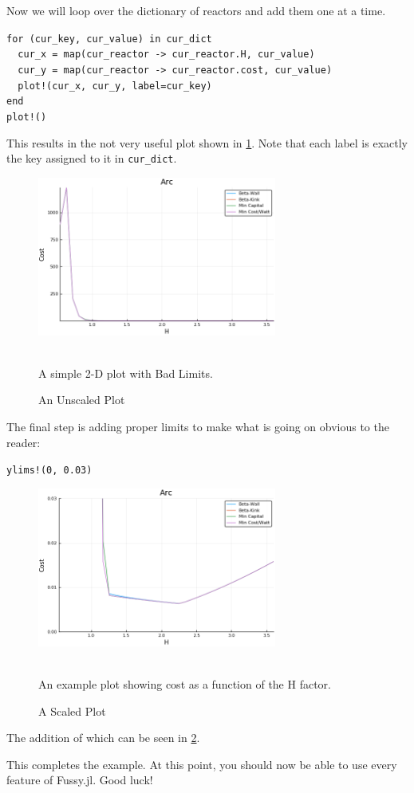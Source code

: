 Now we will loop over the dictionary of reactors and add them one at a time.

\begin{addmargin}[1.5em]{1.5em}
\texttt{for (cur\_key, cur\_value) in cur\_dict \\
\-\ \-\ cur\_x = map(cur\_reactor -> cur\_reactor.H, cur\_value) \\
\-\ \-\ cur\_y = map(cur\_reactor -> cur\_reactor.cost, cur\_value) \\
\-\ \-\ plot!(cur\_x, cur\_y, label=cur\_key) \\
end \\
plot!()
}
\end{addmargin}

This results in the not very useful plot shown in \cref{fig:example_3}. Note that each label is exactly the key assigned to it in \texttt{cur\_dict}.

\begin{figure}
	\centering
	\includegraphics[width=0.7\textwidth]{images/example_3}
	\caption{An Unscaled Plot} ~\\
	\small A simple 2-D plot with Bad Limits.
	\label{fig:example_3}
\end{figure}

The final step is adding proper limits to make what is going on obvious to the reader:

\begin{addmargin}[1.5em]{1.5em}
\texttt{ylims!(0, 0.03)}
\end{addmargin}

\begin{figure}
	\centering
	\includegraphics[width=0.7\textwidth]{images/example_4}
	\caption{A Scaled Plot} ~\\
	\small An example plot showing cost as a function of the H factor.
	\label{fig:example_4}
\end{figure}

The addition of which can be seen in \cref{fig:example_4}.

This completes the example. At this point, you should now be able to use every feature of Fussy.jl. Good luck!
